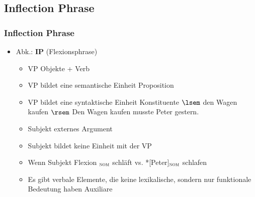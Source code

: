 \subsection{Inflection Phrase}

\begin{frame}
\frametitle{Inflection Phrase}

\begin{itemize}
	\item Abk.: \textbf{IP} (Flexionsphrase)
	\begin{itemize}
		\item VP \ras Objekte + Verb
		\item VP bildet eine semantische Einheit \ras Proposition
		\item VP bildet eine syntaktische Einheit \ras Konstituente
		\eal
		\ex $\lsem$ den Wagen kaufen $\rsem$
		\ex \alert{Den Wagen kaufen} musste Peter gestern. 
		\zl

\pause
		\item Subjekt \ras externes Argument
		\item Subjekt bildet keine Einheit mit der VP
		\z

		\item Wenn Subjekt \ras Flexion
		\ea [Peter]$_{\textsc{nom}}$ schläft vs. *[Peter]$_{\textsc{nom}}$ schlafen
		\z
		
		\item Es gibt verbale Elemente, die keine lexikalische, sondern nur funktionale Bedeutung haben \ras Auxiliare

	\end{itemize}
\end{itemize}

\end{frame}


